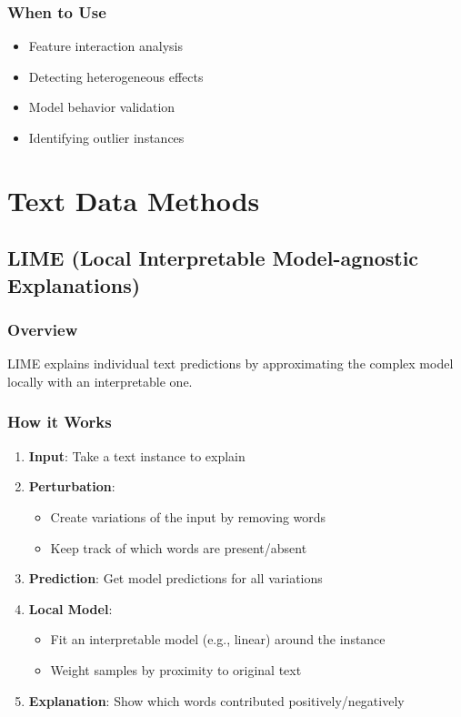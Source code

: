 \documentclass{article}
\begin{document}
\subsubsection{When to Use}
\begin{itemize}
    \item Feature interaction analysis
    \item Detecting heterogeneous effects
    \item Model behavior validation
    \item Identifying outlier instances
\end{itemize}

\section{Text Data Methods}

\subsection{LIME (Local Interpretable Model-agnostic Explanations)}

\subsubsection{Overview}
LIME explains individual text predictions by approximating the complex model locally with an interpretable one.

\subsubsection{How it Works}
\begin{enumerate}
    \item \textbf{Input}: Take a text instance to explain
    \item \textbf{Perturbation}: 
        \begin{itemize}
            \item Create variations of the input by removing words
            \item Keep track of which words are present/absent
        \end{itemize}
    \item \textbf{Prediction}: Get model predictions for all variations
    \item \textbf{Local Model}: 
        \begin{itemize}
            \item Fit an interpretable model (e.g., linear) around the instance
            \item Weight samples by proximity to original text
        \end{itemize}
    \item \textbf{Explanation}: Show which words contributed positively/negatively
\end{enumerate}
\end{document}
